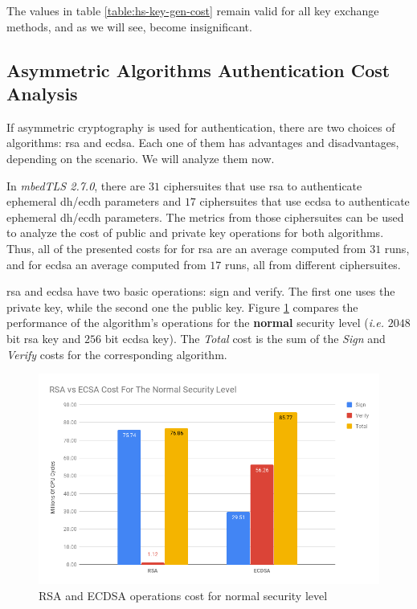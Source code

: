 The values in table \ref{table:hs-key-gen-cost} remain valid for all key exchange methods, and as we will see,
become insignificant.

\subsection{Asymmetric Algorithms Authentication Cost Analysis} \label{sec:asym-algs-analysis}

If asymmetric cryptography is used for authentication, there are two
choices of algorithms: \gls{rsa} and \gls{ecdsa}. Each one of them has advantages and disadvantages, depending on the
scenario. We will analyze them now.

In \textit{mbedTLS 2.7.0}, there are $31$ ciphersuites that use \gls{rsa} to authenticate ephemeral \gls{dh}/\gls{ecdh} parameters
and $17$ ciphersuites that use \gls{ecdsa} to authenticate ephemeral \gls{dh}/\gls{ecdh} parameters. The metrics from those
ciphersuites can be used to analyze the cost of public and private key operations for both algorithms. Thus, all of the presented
costs for for \gls{rsa} are an average computed from $31$ runs, and for \gls{ecdsa} an average computed from $17$ runs, all from
different ciphersuites.

\gls{rsa} and \gls{ecdsa} have two basic operations: sign and verify. The first one uses the private key, while the
second one the public key. Figure \ref{fig:rsa-ecdsa-sign-ver-total-normal-sl} compares the performance of the algorithm's
operations for the \textbf{normal} security level (\textit{i.e.} $2048$ bit \gls{rsa} key and $256$ bit \gls{ecdsa} key).
The \textit{Total} cost is the sum of the \textit{Sign} and \textit{Verify} costs for the corresponding algorithm.

\begin{figure}
  \centering
  \includegraphics[width=1.0\textwidth]{img/rsa_ecdsa_cost_normal_sl.png}
  \centering \caption{\label{fig:rsa-ecdsa-sign-ver-total-normal-sl} RSA and ECDSA operations cost for normal security level}
\end{figure}

